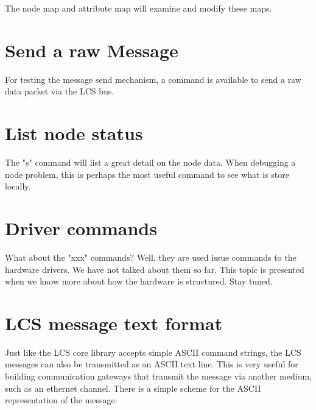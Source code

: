 The node map and attribute map will examine and modify these maps.


\section{Send a raw Message}

For testing the message send mechanism, a command is available to send a raw data packet via the LCS bus.


\section{List node status}

The "s" command will list a great detail on the node data. When debugging a node problem, this is perhaps the most useful command to see what is store locally.


\section{Driver commands}



What about the "xxx" commands? Well, they are used issue commands to the hardware drivers. We have not talked about them so far. This topic is presented when we know more about how the hardware is structured. Stay tuned.

\section{LCS message text format}

Just like the LCS core library accepts simple ASCII command strings, the LCS messages can also be transmitted as an ASCII text line. This is very useful for building communication gateways that transmit the message via another medium, such as an ethernet channel. There is a simple scheme for the ASCII representation of the message:

